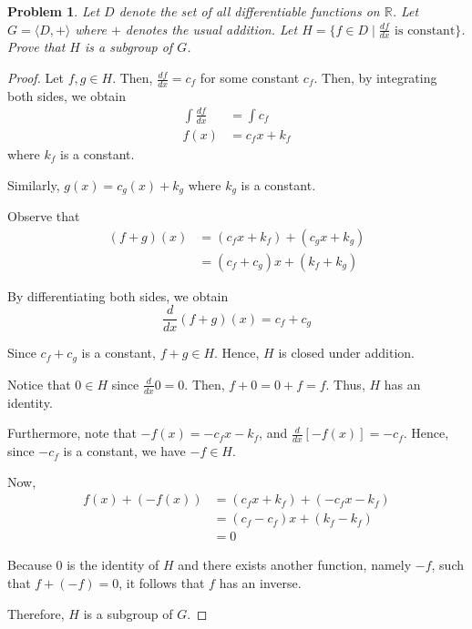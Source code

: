 \documentclass{article}
\newtheorem{problem}{Problem}
\begin{document}
\begin{problem}
Let $D$ denote the set of all differentiable functions on $\mathbb{R}$.
Let $G=\langle D,+ \rangle$ where $+$ denotes the usual addition.
Let $H=\{f \in D \mid \frac{df}{dx} \text{ is constant}\}$.
Prove that $H$ is a subgroup of $G$.
\end{problem}
\begin{proof}
Let $f,g \in H$. Then, $\frac{df}{dx}=c_f$ for some constant $c_f$. Then,
by integrating both sides, we obtain
\begin{align*}
\int \frac{df}{dx}&=\int c_f\\
f(x)&=c_fx+k_f
\end{align*}
where $k_f$ is a constant.

Similarly, $g(x)=c_g(x)+k_g$ where $k_g$ is a constant.

Observe that
\begin{align*}
(f+g)(x)&=(c_fx+k_f)+(c_gx+k_g)\\
&=(c_f+c_g)x+(k_f+k_g)
\end{align*}

By differentiating both sides, we obtain
\begin{equation*}
\frac{d}{dx}(f+g)(x)=c_f+c_g
\end{equation*}

Since $c_f+c_g$ is a constant, $f+g \in H$. Hence, $H$ is closed under addition.

Notice that $0 \in H$ since $\frac{d}{dx}0=0$. Then, $f+0=0+f=f$.
Thus, $H$ has an identity.

Furthermore, note that $-f(x)=-c_fx-k_f$, and $\frac{d}{dx}{[-f(x)]}=-c_f$.
Hence, since $-c_f$ is a constant, we have $-f \in H$.

Now,
\begin{align*}
f(x)+(-f(x))&=(c_fx+k_f)+(-c_fx-k_f)\\
&=(c_f-c_f)x+(k_f-k_f)\\
&=0
\end{align*}

Because $0$ is the identity of $H$ and there exists another function,
namely $-f$, such that $f+(-f)=0$, it follows that $f$ has an inverse.

Therefore, $H$ is a subgroup of $G$.
\end{proof}
\end{document}
